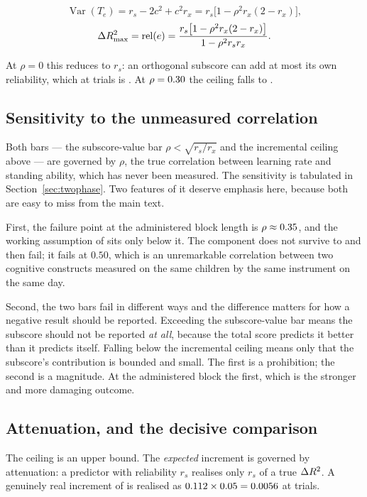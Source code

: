 \[
\operatorname{Var}(T_e)=r_s-2c^{2}+c^{2}r_x=r_s\big[1-\rho^{2}r_x(2-r_x)\big],
\]
\[
\Delta R^{2}_{\max}=\operatorname{rel}(e)
=\frac{r_s\big[1-\rho^{2}r_x(2-r_x)\big]}{1-\rho^{2}r_sr_x} .
\]

At $\rho=0$ this reduces to $r_s$: an orthogonal subscore can add at most its
own reliability, which at \BlockAdministered{} trials is \RelLRthirty{}. At
$\rho=0.30$ the ceiling falls to \HabCeilThirty{}.

\subsection{Sensitivity to the unmeasured correlation}

Both bars --- the subscore-value bar $\rho < \sqrt{r_s/r_x}$ and the incremental
ceiling above --- are governed by $\rho$, the true correlation between learning
rate and standing ability, which has never been measured. The sensitivity is
tabulated in Section~\ref{sec:twophase}. Two features of it deserve emphasis
here, because both are easy to miss from the main text.

First, the failure point at the administered block length is $\rho \approx
0.35{}$, and the working assumption of \RhoLRstanding{} sits only
\HabermanMarginThirty{} below it. The component does not survive to
\RhoLRcollapse{} and then fail; it fails at $0.50$, which is an unremarkable
correlation between two cognitive constructs measured on the same children by
the same instrument on the same day.

Second, the two bars fail in different ways and the difference matters for how a
negative result should be reported. Exceeding the subscore-value bar means the
subscore should not be reported \emph{at all}, because the total score predicts
it better than it predicts itself. Falling below the incremental ceiling means
only that the subscore's contribution is bounded and small. The first is a
prohibition; the second is a magnitude. At \RhoLRcollapse{} the administered
block \HabermanCollapseVerdict{} the first, which is the stronger and more
damaging outcome.

\subsection{Attenuation, and the decisive comparison}

The ceiling is an upper bound. The \emph{expected} increment is governed by
attenuation: a predictor with reliability $r_s$ realises only $r_s$ of a true
$\Delta R^{2}$. A genuinely real increment of \TrueDeltaAssumed{} is realised as
$0.112\times0.05=0.0056$ at \BlockAdministered{}
trials.

